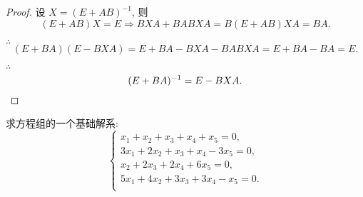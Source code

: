 \documentclass{ctexart}
\begin{document}
\begin{proof}
    设 $X=(E+AB)^{-1}$, 则
    \[(E+AB)X=E\Rightarrow BXA+BABXA=B(E+AB)XA=BA.\]

    $\therefore$
    \[(E+BA)(E-BXA)=E+BA-BXA-BABXA=E+BA-BA=E.\]

    $\therefore$
    \[(E+BA)^{-1}=E-BXA.\qedhere\]
\end{proof}
\begin{exercisec}[3.5.1]
    求方程组的一个基础解系:
    \[\begin{cases}
        x_1+x_2+x_3+x_4+x_5=0, \\
        3x_1+2x_2+x_3+x_4-3x_5=0, \\
        x_2+2x_3+2x_4+6x_5=0, \\
        5x_1+4x_2+3x_3+3x_4-x_5=0. \\
    \end{cases}\]
\end{exercisec}
\end{document}
